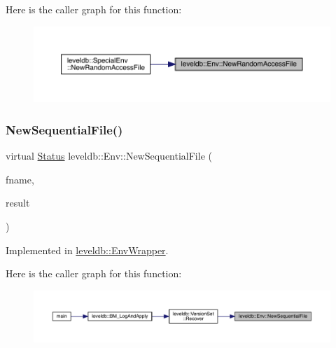 Here is the caller graph for this function\+:
\nopagebreak
\begin{figure}[H]
\begin{center}
\leavevmode
\includegraphics[width=350pt]{classleveldb_1_1_env_a1df3e0bb2d47ee914448df9bb9ca0734_icgraph}
\end{center}
\end{figure}
\mbox{\label{classleveldb_1_1_env_ad73810059f48c1d7b91125d357e7d351}} 
\subsubsection{\texorpdfstring{NewSequentialFile()}{NewSequentialFile()}}
{\footnotesize\ttfamily virtual \mbox{\hyperlink{classleveldb_1_1_status}{Status}} leveldb\+::\+Env\+::\+New\+Sequential\+File (\begin{DoxyParamCaption}\item[{const std\+::string \&}]{fname,  }\item[{\mbox{\hyperlink{classleveldb_1_1_sequential_file}{Sequential\+File}} $\ast$$\ast$}]{result }\end{DoxyParamCaption})\hspace{0.3cm}{\ttfamily [pure virtual]}}



Implemented in \mbox{\hyperlink{classleveldb_1_1_env_wrapper_a3681800d0263b7bc77a066fdfb69e005}{leveldb\+::\+Env\+Wrapper}}.

Here is the caller graph for this function\+:
\nopagebreak
\begin{figure}[H]
\begin{center}
\leavevmode
\includegraphics[width=350pt]{classleveldb_1_1_env_ad73810059f48c1d7b91125d357e7d351_icgraph}
\end{center}
\end{figure}
\mbox{\label{classleveldb_1_1_env_a4566194f3e82fede425fdb5bb355f7de}} 
